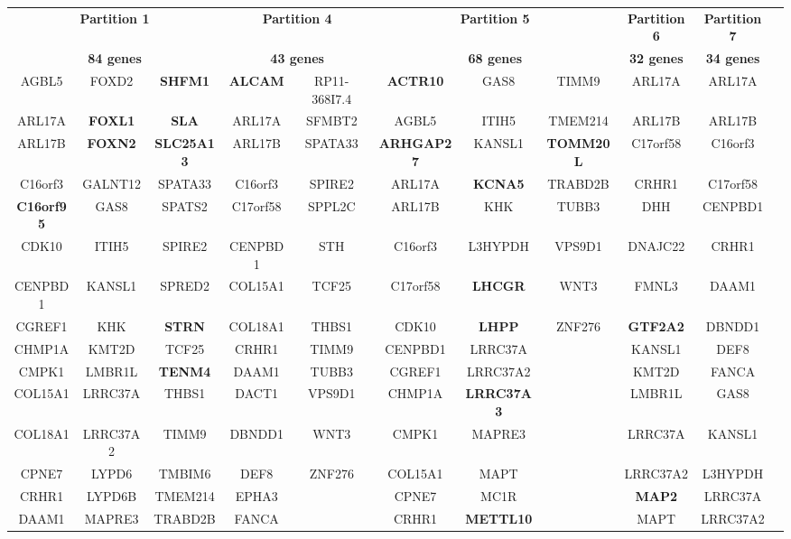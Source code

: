 \begin{table}[H]
\centering
\begin{adjustwidth}{-3 cm}{-2.5 cm}
\begin{threeparttable}
	\tiny
	\begin{tabular}{ccc||cc||ccc||c||cc}\toprule
		\multicolumn{3}{c}{\textbf{Partition 1}} &\multicolumn{2}{c}{\textbf{Partition 4}} &\multicolumn{3}{c}{\textbf{Partition 5}} &\textbf{Partition 6} &\textbf{Partition 7} \\
		\multicolumn{3}{c}{\textbf{84 genes}} &\multicolumn{2}{c}{\textbf{43 genes}} &\multicolumn{3}{c}{\textbf{68 genes}} &\textbf{32 genes} &\textbf{34 genes}
		\\\midrule
		AGBL5 &FOXD2 &\textbf{SHFM1} &\textbf{ALCAM} &RP11-368I7.4 &\textbf{ACTR10} &GAS8 &TIMM9 &ARL17A &ARL17A \\
		ARL17A &\textbf{FOXL1} &\textbf{SLA} &ARL17A &SFMBT2 &AGBL5 &ITIH5 &TMEM214 &ARL17B &ARL17B \\
		ARL17B &\textbf{FOXN2} &\textbf{SLC25A13} &ARL17B &SPATA33 &\textbf{ARHGAP27} &KANSL1 &\textbf{TOMM20L} &C17orf58 &C16orf3 \\
		C16orf3 &GALNT12 &SPATA33 &C16orf3 &SPIRE2 &ARL17A &\textbf{KCNA5} &TRABD2B &CRHR1 &C17orf58 \\
		\textbf{C16orf95} &GAS8 &SPATS2 &C17orf58 &SPPL2C &ARL17B &KHK &TUBB3 &DHH &CENPBD1 \\
		CDK10 &ITIH5 &SPIRE2 &CENPBD1 &STH &C16orf3 &L3HYPDH &VPS9D1 &DNAJC22 &CRHR1 \\
		CENPBD1 &KANSL1 &SPRED2 &COL15A1 &TCF25 &C17orf58 &\textbf{LHCGR} &WNT3 &FMNL3 &DAAM1 \\
		CGREF1 &KHK &\textbf{STRN} &COL18A1 &THBS1 &CDK10 &\textbf{LHPP} &ZNF276 &\textbf{GTF2A2} &DBNDD1 \\
		CHMP1A &KMT2D &TCF25 &CRHR1 &TIMM9 &CENPBD1 &LRRC37A & &KANSL1 &DEF8 \\
		CMPK1 &LMBR1L &\textbf{TENM4} &DAAM1 &TUBB3 &CGREF1 &LRRC37A2 & &KMT2D &FANCA \\
		COL15A1 &LRRC37A &THBS1 &DACT1 &VPS9D1 &CHMP1A &\textbf{LRRC37A3} &\textbf{} &LMBR1L &GAS8 \\
		COL18A1 &LRRC37A2 &TIMM9 &DBNDD1 &WNT3 &CMPK1 &MAPRE3 & &LRRC37A &KANSL1 \\
		CPNE7 &LYPD6 &TMBIM6 &DEF8 &ZNF276 &COL15A1 &MAPT & &LRRC37A2 &L3HYPDH \\
		CRHR1 &LYPD6B &TMEM214 &EPHA3 & &CPNE7 &MC1R & &\textbf{MAP2} &LRRC37A \\
		DAAM1 &MAPRE3 &TRABD2B &FANCA & &CRHR1 &\textbf{METTL10} &\textbf{} &MAPT &LRRC37A2 \\

\end{tabular}
\end{threeparttable}
\end{adjustwidth}
\end{table}
